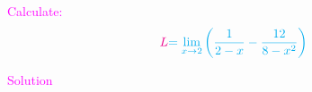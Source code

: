 \documentclass[a3paper, 11pt]{memoir}
\begin{document}
  \pagecolor{pagecolor}
  \newpage
  \huge
  \textcolor{magenta}{Calculate:} 
  \begin{equation*}
      \textcolor{magenta}{L} \textcolor{cyan}{ = \lim_{x \to 2 } \left( \dfrac{1}{2-x} - \dfrac{12}{8-x^{2}} \right) }
  \end{equation*}
  \begin{center}
    \textcolor{magenta}{Solution}
  \end{center}
  
  
\end{document}
